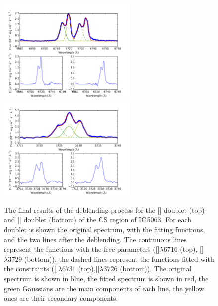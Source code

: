 \documentclass[../thesis.tex]{subfiles}
\begin{document}
\begin{figure}
\centering
\includegraphics[width=0.6\textwidth]{images/paper1/s2.pdf} \\
\vskip0.2cm
\includegraphics[width=0.6\textwidth]{images/paper1/o2.pdf}\\
\caption[]{The final results of the deblending process for the [] doublet (top) and [] doublet (bottom) of the CS region of IC\,5063. For each doublet is shown the original spectrum, with the fitting functions, and the two lines after the deblending. The continuous lines represent the functions with the free parameters ([]$\lambda6716$ (top), []$\lambda3729$ (bottom)), the dashed lines represent the functions fitted with the constraints ([]$\lambda6731$ (top),[]$\lambda3726$ (bottom)). The original spectrum is shown in blue, the fitted spectrum is shown in red, the green Gaussians are the main components of each line, the yellow ones are their secondary components. }
\label{fig:deb}
\end{figure}
\end{document}
